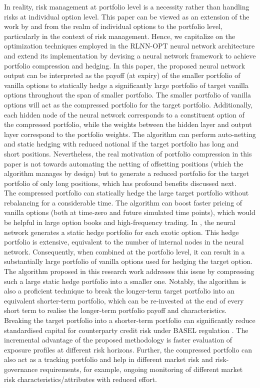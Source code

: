 \noindent In reality, risk management at portfolio level is a necessity rather than handling risks at individual option level. This paper can be viewed as an extension of the work by \cite{lokeshwar2022explainable} and \cite{dhandapani2024bermudan} from the realm of individual options to the portfolio level, particularly in the context of risk management. Hence, we capitalize on the optimization techniques employed in the RLNN-OPT neural network architecture and extend its implementation by devising a neural network framework to achieve portfolio compression and hedging. In this paper, the proposed neural network output can be interpreted as the payoff (at expiry) of the smaller portfolio of vanilla options to statically hedge a significantly large portfolio of target vanilla options throughout the span of smaller portfolio. The smaller portfolio of vanilla options will act as the compressed portfolio for the target portfolio. Additionally, each hidden node of the neural network corresponds to a constituent option of the compressed portfolio, while the weights between the hidden layer and output layer correspond to the portfolio weights. The algorithm can perform auto-netting and static hedging with reduced notional if the target portfolio has long and short positions. Nevertheless, the real motivation of portfolio compression in this paper is not towards automating the netting of offsetting positions (which the algorithm manages by design) but to generate a reduced portfolio for the target portfolio of only long positions, which has profound benefits discussed next. \\

\noindent The compressed portfolio can statically hedge the large target portfolio without rebalancing for a considerable time. The algorithm can boost faster pricing of vanilla options (both at time-zero and future simulated time points), which would be helpful in large option books and high-frequency trading. In \cite{lokeshwar2022explainable}, the neural network generates a static hedge portfolio for each exotic option. This hedge portfolio is extensive, equivalent to the number of internal nodes in the neural network. Consequently, when combined at the portfolio level, it can result in a substantially large portfolio of vanilla options used for hedging the target option. The algorithm proposed in this research work addresses this issue by compressing such a large static hedge portfolio into a smaller one. Notably, the algorithm is also a proficient technique to break the longer-term target portfolio into an equivalent shorter-term portfolio, which can be re-invested at the end of every short term to realise the longer-term portfolio payoff and characteristics. Breaking the target portfolio into a shorter-term portfolio can significantly reduce standardised capital for counterparty credit risk under BASEL regulation \cite{biscre52}. The incremental advantage of the proposed methodology is faster evaluation of exposure profiles at different risk horizons. Further, the compressed portfolio can also act as a tracking portfolio and help in different market risk and risk-governance requirements, for example, ongoing monitoring of different market risk characteristics/attributes with reduced effort.

